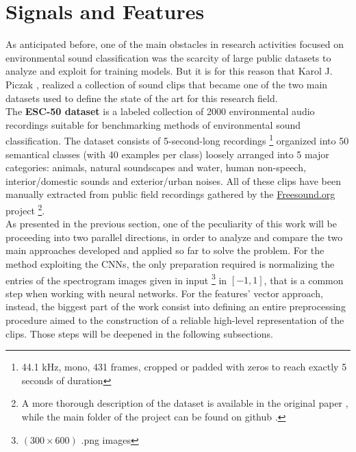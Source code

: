 \section{Signals and Features}
\label{sec:model}

As anticipated before, one of the main obstacles in research activities focused on environmental sound classification was the scarcity of large public datasets to analyze and exploit for training models. But it is for this reason that Karol J. Piczak \cite{piczak2015dataset}, realized a collection of sound clips that became one of the two main datasets used to define the state of the art for this research field.\\
The \textbf{ESC-50 dataset} is a labeled collection of 2000 environmental audio recordings suitable for benchmarking methods of environmental sound classification. The dataset consists of 5-second-long recordings \footnote{44.1 kHz, mono, 431 frames, cropped or padded with zeros to reach exactly 5 seconds of duration} organized into 50 semantical classes (with 40 examples per class) loosely arranged into 5 major categories: animals, natural soundscapes and water, human non-speech, interior/domestic sounds and exterior/urban noises. All of these clips have been manually extracted from public field recordings gathered by the \url{Freesound.org} project \footnote{A more thorough description of the dataset is available in the original paper \cite{piczak2015dataset}, while the main folder of the project can be found on github \cite{piczakgithub}.}.\\
As presented in the previous section, one of the peculiarity of this work will be proceeding into two parallel directions, in order to analyze and compare the two main approaches developed and applied so far to solve the problem. For the method exploiting the CNNs, the only preparation required is normalizing the entries of the spectrogram images given in input  \footnote{$(300\times 600)$ .png images} in $[-1,1]$, that is a common step when working with neural networks. For the features' vector approach, instead, the biggest part of the work consist into defining an entire preprocessing procedure aimed to the construction of a reliable high-level representation of the clips. Those steps will be deepened in the following subsections.

